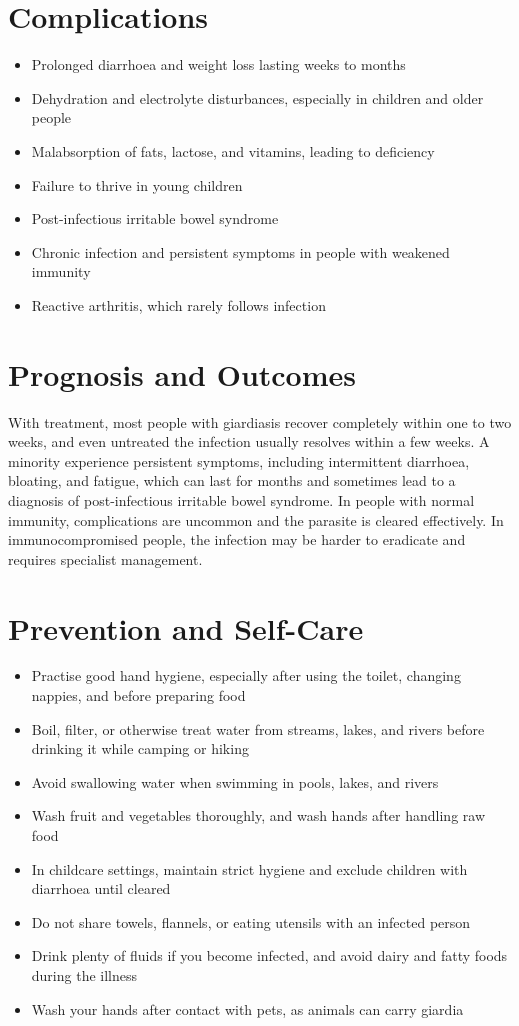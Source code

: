 \section*{Complications}
\begin{itemize}
    \item Prolonged diarrhoea and weight loss lasting weeks to months
    \item Dehydration and electrolyte disturbances, especially in children and older people
    \item Malabsorption of fats, lactose, and vitamins, leading to deficiency
    \item Failure to thrive in young children
    \item Post-infectious irritable bowel syndrome
    \item Chronic infection and persistent symptoms in people with weakened immunity
    \item Reactive arthritis, which rarely follows infection
\end{itemize}

\section*{Prognosis and Outcomes}
With treatment, most people with giardiasis recover completely within one to two weeks, and even untreated the infection usually resolves within a few weeks. A minority experience persistent symptoms, including intermittent diarrhoea, bloating, and fatigue, which can last for months and sometimes lead to a diagnosis of post-infectious irritable bowel syndrome. In people with normal immunity, complications are uncommon and the parasite is cleared effectively. In immunocompromised people, the infection may be harder to eradicate and requires specialist management.

\section*{Prevention and Self-Care}
\begin{itemize}
    \item Practise good hand hygiene, especially after using the toilet, changing nappies, and before preparing food
    \item Boil, filter, or otherwise treat water from streams, lakes, and rivers before drinking it while camping or hiking
    \item Avoid swallowing water when swimming in pools, lakes, and rivers
    \item Wash fruit and vegetables thoroughly, and wash hands after handling raw food
    \item In childcare settings, maintain strict hygiene and exclude children with diarrhoea until cleared
    \item Do not share towels, flannels, or eating utensils with an infected person
    \item Drink plenty of fluids if you become infected, and avoid dairy and fatty foods during the illness
    \item Wash your hands after contact with pets, as animals can carry giardia
\end{itemize}

